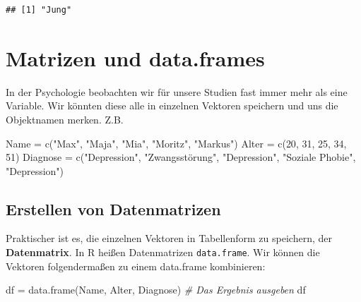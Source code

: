 \documentclass[
]{book}
\newenvironment{Shaded}{\begin{snugshade}}{\end{snugshade}}
\newcommand{\CommentTok}[1]{\textcolor[rgb]{0.56,0.35,0.01}{\textit{#1}}}
\newcommand{\DecValTok}[1]{\textcolor[rgb]{0.00,0.00,0.81}{#1}}
\newcommand{\FunctionTok}[1]{\textcolor[rgb]{0.00,0.00,0.00}{#1}}
\newcommand{\NormalTok}[1]{#1}
\newcommand{\OtherTok}[1]{\textcolor[rgb]{0.56,0.35,0.01}{#1}}
\newcommand{\StringTok}[1]{\textcolor[rgb]{0.31,0.60,0.02}{#1}}
\begin{document}
\begin{verbatim}
## [1] "Jung"
\end{verbatim}

\hypertarget{matrizen-und-data.frames}{%
\section{Matrizen und data.frames}\label{matrizen-und-data.frames}}

In der Psychologie beobachten wir für unsere Studien fast immer mehr als eine Variable. Wir könnten diese alle in einzelnen Vektoren speichern und uns die Objektnamen merken. Z.B.

\begin{Shaded}
\begin{Highlighting}[]
\NormalTok{Name }\OtherTok{=} \FunctionTok{c}\NormalTok{(}\StringTok{"Max"}\NormalTok{, }\StringTok{"Maja"}\NormalTok{, }\StringTok{"Mia"}\NormalTok{, }\StringTok{"Moritz"}\NormalTok{, }\StringTok{"Markus"}\NormalTok{)}
\NormalTok{Alter }\OtherTok{=} \FunctionTok{c}\NormalTok{(}\DecValTok{20}\NormalTok{, }\DecValTok{31}\NormalTok{, }\DecValTok{25}\NormalTok{, }\DecValTok{34}\NormalTok{, }\DecValTok{51}\NormalTok{)}
\NormalTok{Diagnose }\OtherTok{=} \FunctionTok{c}\NormalTok{(}\StringTok{"Depression"}\NormalTok{, }\StringTok{"Zwangsstörung"}\NormalTok{, }\StringTok{"Depression"}\NormalTok{, }\StringTok{"Soziale Phobie"}\NormalTok{, }\StringTok{"Depression"}\NormalTok{)}
\end{Highlighting}
\end{Shaded}

\hypertarget{erstellen-von-datenmatrizen}{%
\subsection{Erstellen von Datenmatrizen}\label{erstellen-von-datenmatrizen}}

Praktischer ist es, die einzelnen Vektoren in Tabellenform zu speichern, der \textbf{Datenmatrix}. In R heißen Datenmatrizen \texttt{data.frame}. Wir können die Vektoren folgendermaßen zu einem data.frame kombinieren:

\begin{Shaded}
\begin{Highlighting}[]
\NormalTok{df }\OtherTok{=} \FunctionTok{data.frame}\NormalTok{(Name, Alter, Diagnose)}
\CommentTok{\# Das Ergebnis ausgeben}
\NormalTok{df}
\end{Highlighting}
\end{Shaded}
\end{document}
